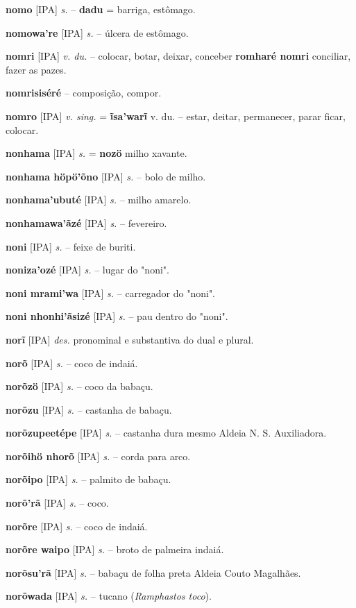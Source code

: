 \textbf{nomo} [IPA] \textit{s.} -- \textbf{dadu} = barriga, estômago.

\textbf{nomowa're} [IPA] \textit{s.} -- úlcera de estômago.

\textbf{nomri} [IPA] \textit{v. du.} -- colocar, botar, deixar, conceber  \textbf{romharé nomri} conciliar, fazer as pazes.

\textbf{nomrisiséré} -- composição, compor.

\textbf{nomro} [IPA] \textit{v. sing.} = \textbf{ĩsa'warĩ} v. du. -- estar, deitar, permanecer, parar ficar, colocar.

\textbf{nonhama} [IPA] \textit{s.} = \textbf{nozö} milho xavante.

\textbf{nonhama höpö'õno} [IPA] \textit{s.} -- bolo de milho.

\textbf{nonhama'ubuté} [IPA] \textit{s.} -- milho amarelo.

\textbf{nonhamawa'ãzé} [IPA] \textit{s.} -- fevereiro.

\textbf{noni} [IPA] \textit{s.} -- feixe de buriti.

\textbf{noniza'ozé} [IPA] \textit{s.} -- lugar do "noni".

\textbf{noni mrami'wa} [IPA] \textit{s.} -- carregador do "noni".

\textbf{noni nhonhi'ãsizé} [IPA] \textit{s.} -- pau dentro do "noni".

\textbf{norĩ} [IPA] \textit{des.} pronominal e substantiva do dual e plural.

\textbf{norõ} [IPA] \textit{s.} -- coco de indaiá.

\textbf{norõzö} [IPA] \textit{s.} -- coco da babaçu.

\textbf{norõzu} [IPA] \textit{s.} -- castanha de babaçu.

\textbf{norõzupeetépe} [IPA] \textit{s.} -- castanha dura mesmo  Aldeia N. S. Auxiliadora.

\textbf{norõihö nhorõ} [IPA] \textit{s.} -- corda para arco.

\textbf{norõipo} [IPA] \textit{s.} -- palmito de babaçu.

\textbf{norõ'rã} [IPA] \textit{s.} -- coco.

\textbf{norõre} [IPA] \textit{s.} -- coco de indaiá.

\textbf{norõre waipo} [IPA] \textit{s.} -- broto de palmeira indaiá.

\textbf{norõsu'rã} [IPA] \textit{s.} -- babaçu de folha preta  Aldeia Couto Magalhães.

\textbf{norõwada} [IPA] \textit{s.} -- tucano (\textit{Ramphastos toco}).

